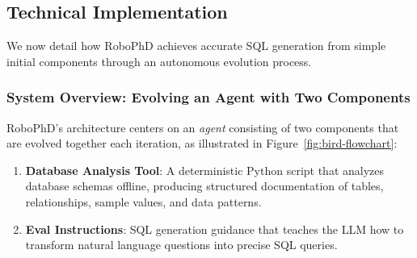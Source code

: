 \documentclass{article}
\begin{document}
\subsection{Technical Implementation}
\label{subsec:technical}

We now detail how RoboPhD achieves accurate SQL generation from simple initial components through an autonomous evolution process.

\subsubsection{System Overview: Evolving an Agent with Two Components}

RoboPhD's architecture centers on an \textit{agent} consisting of two components that are evolved together each iteration, as illustrated in Figure~\ref{fig:bird-flowchart}:

\begin{enumerate}
    \item \textbf{Database Analysis Tool}: A deterministic Python script that analyzes database schemas offline, producing structured documentation of tables, relationships, sample values, and data patterns.
    \item \textbf{Eval Instructions}: SQL generation guidance that teaches the LLM how to transform natural language questions into precise SQL queries.
\end{enumerate}
\end{document}
